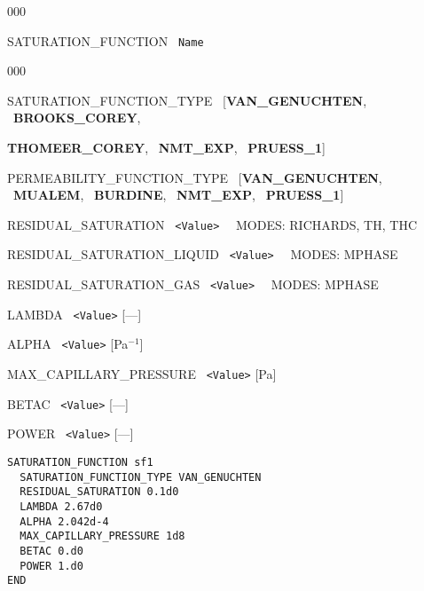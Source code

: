 
\begin{deflist}{000}
\item[SATURATION\_FUNCTION] \ {\tt Name}

\begin{deflist}{000}
\item[SATURATION\_FUNCTION\_TYPE] \ [{\bf VAN\_GENUCHTEN}, \ {\bf BROOKS\_COREY}, 

{\bf THOMEER\_COREY}, \ {\bf NMT\_EXP}, \ {\bf PRUESS\_1}]

\item[PERMEABILITY\_FUNCTION\_TYPE] \ [{\bf VAN\_GENUCHTEN}, \ {\bf MUALEM}, \ {\bf BURDINE}, \ {\bf NMT\_EXP}, \ {\bf PRUESS\_1}]
\item[RESIDUAL\_SATURATION] \ {\tt <Value>} \ \ MODES: RICHARDS, TH, THC
\item[RESIDUAL\_SATURATION\_LIQUID] \ {\tt <Value>} \ \ MODES: MPHASE
\item[RESIDUAL\_SATURATION\_GAS] \ {\tt <Value>} \ \ MODES: MPHASE
\item[LAMBDA] \ {\tt <Value>} [---]
\item[ALPHA] \ {\tt <Value>} [Pa$^{-1}$]
\item[MAX\_CAPILLARY\_PRESSURE] \ {\tt <Value>} [Pa]
\item[BETAC] \ {\tt <Value>} [---]
\item[POWER] \ {\tt <Value>} [---]
\end{deflist}
\item[\keyend]
\end{deflist}


\begin{mdframed}

\begin{verbatim}
SATURATION_FUNCTION sf1
  SATURATION_FUNCTION_TYPE VAN_GENUCHTEN
  RESIDUAL_SATURATION 0.1d0
  LAMBDA 2.67d0
  ALPHA 2.042d-4
  MAX_CAPILLARY_PRESSURE 1d8
  BETAC 0.d0
  POWER 1.d0
END
\end{verbatim}

\end{mdframed}

\hyperlink{target_key}{\return}


\newpage
\protect\hypertarget{target_src}{}

